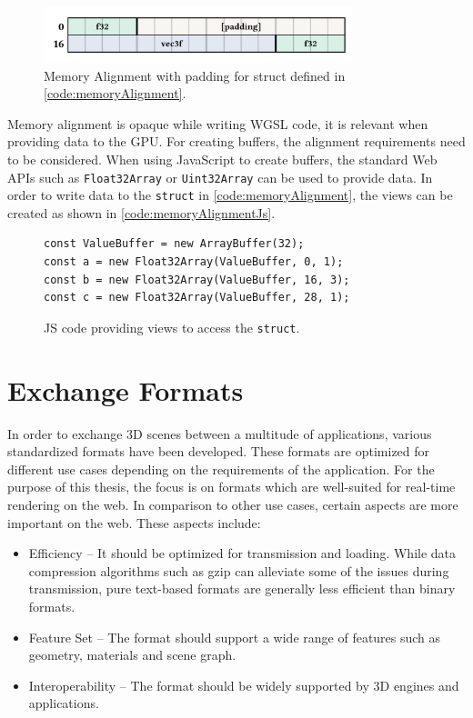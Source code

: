 \begin{figure}[H]
  \centering
  \includegraphics[width=0.8\textwidth]{resources/memory-alignment.png}
  \caption{Memory Alignment with padding for struct defined in \autoref{code:memoryAlignment}.}
  \label{fig:memory-alignment}
\end{figure}

Memory alignment is opaque while writing \gls{WGSL} code, it is relevant when providing data to the GPU. For creating buffers, the alignment requirements need to be considered. When using JavaScript to create buffers, the standard Web \glspl{API} such as \texttt{Float32Array} or \texttt{Uint32Array} can be used to provide data. In order to write data to the \texttt{struct} in \autoref{code:memoryAlignment}, the views can be created as shown in \autoref{code:memoryAlignmentJs}.

\begin{figure}[H]
  \begin{lstlisting}[style=JavaScript]
const ValueBuffer = new ArrayBuffer(32);
const a = new Float32Array(ValueBuffer, 0, 1);
const b = new Float32Array(ValueBuffer, 16, 3);
const c = new Float32Array(ValueBuffer, 28, 1);
  \end{lstlisting}
  \caption{JS code providing views to access the \texttt{struct}.}
  \label{code:memoryAlignmentJs}
\end{figure}


\section{Exchange Formats}

In order to exchange 3D scenes between a multitude of applications, various standardized formats have been developed. These formats are optimized for different use cases depending on the requirements of the application. For the purpose of this thesis, the focus is on formats which are well-suited for real-time rendering on the web. In comparison to other use cases, certain aspects are more important on the web. These aspects include:

\begin{itemize}
    \item{Efficiency} – It should be optimized for transmission and loading. While data compression algorithms such as gzip can alleviate some of the issues during transmission, pure text-based formats are generally less efficient than binary formats.
    \item{Feature Set} – The format should support a wide range of features such as geometry, materials and scene graph.
    \item{Interoperability} – The format should be widely supported by 3D engines and applications.
\end{itemize}

